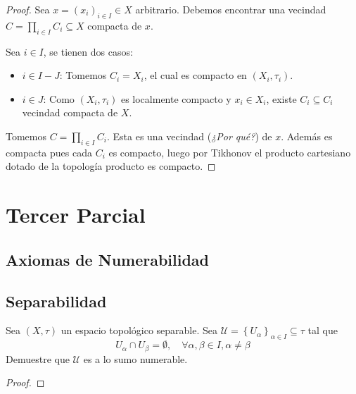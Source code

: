 \documentclass[12pt]{report}
\theoremstyle{largebreak}
\begin{document}
    \begin{proof}
        Sea $x=\left( x_i\right)_{ i\in I} \in X$ arbitrario. Debemos encontrar una vecindad $C=\prod_{i\in I}C_i \subseteq X$ compacta de $x$.
        
        Sea $i\in I$, se tienen dos casos:
        \begin{itemize}
            \item $i\in I-J$: Tomemos $C_i=X_i$, el cual es compacto en $(X_i,\tau_i)$.
            \item $i\in J$: Como $(X_i,\tau_i)$ es localmente compacto y $x_i\in X_i$, existe $C_i\subseteq C_i$ vecindad compacta de $X$.
        \end{itemize}
        Tomemos $C=\prod_{ i\in I}C_i$. Esta es una vecindad (\textit{¿Por qué?}) de $x$. Además es compacta pues cada $C_i$ es compacto, luego por Tikhonov el producto cartesiano dotado de la topología producto es compacto.
    \end{proof}

    \chapter{Tercer Parcial}

    \section{Axiomas de Numerabilidad}

    \section{Separabilidad}

    \begin{excer}
        Sea $(X,\tau)$ un espacio topológico separable. Sea $\mathcal{U}=\left\{U_\alpha \right\}_{\alpha\in I}\subseteq\tau$ tal que
        \begin{equation*}
            U_\alpha\cap U_\beta=\emptyset,\quad\forall \alpha,\beta\in I,\alpha\neq\beta
        \end{equation*}
        Demuestre que $\mathcal{U}$ es a lo sumo numerable.
    \end{excer}

    \begin{proof}
        
    \end{proof}
\end{document}
